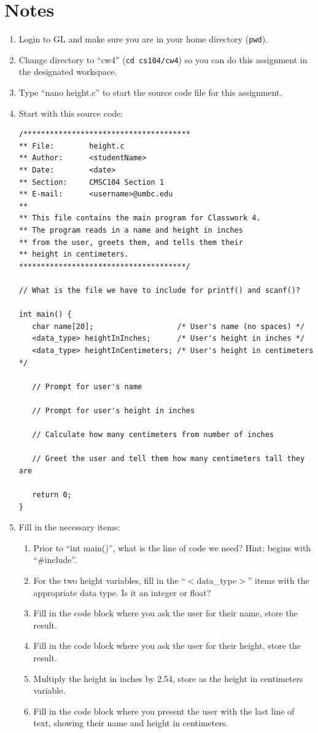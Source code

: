 \documentclass[letter,11pt]{article}
\begin{document}
\section*{Notes}
\begin{enumerate}
    \item Login to GL and make sure you are in your home directory (\texttt{pwd}).
    \item Change directory to ``cw4'' (\texttt{cd cs104/cw4}) so you can do this assignment in the designated workspace.
    \item Type ``nano height.c'' to start the source code file for this assignment.
    \item Start with this source code: 
    \begin{verbatim}
/**************************************
** File:        height.c
** Author:      <studentName>
** Date:        <date>
** Section:     CMSC104 Section 1
** E-mail:      <username>@umbc.edu
**
** This file contains the main program for Classwork 4.
** The program reads in a name and height in inches
** from the user, greets them, and tells them their
** height in centimeters.
**************************************/

// What is the file we have to include for printf() and scanf()?

int main() {
   char name[20];                   /* User's name (no spaces) */
   <data_type> heightInInches;      /* User's height in inches */
   <data_type> heightInCentimeters; /* User's height in centimeters */

   // Prompt for user's name

   // Prompt for user's height in inches

   // Calculate how many centimeters from number of inches

   // Greet the user and tell them how many centimeters tall they are

   return 0;
}
    \end{verbatim}
    \item Fill in the necessary items:
    \begin{enumerate}
        \item Prior to ``int main()'', what is the line of code we need? Hint: begins with ``\#include''.
        \item For the two height variables, fill in the ``$<$data\_type$>$'' items with the appropriate data type. Is it an integer or float?
        \item Fill in the code block where you ask the user for their name, store the result.
        \item Fill in the code block where you ask the user for their height, store the result.
        \item Multiply the height in inches by 2.54, store as the height in centimeters variable.
        \item Fill in the code block where you present the user with the last line of text, showing their name and height in centimeters.
    \end{enumerate}
\end{enumerate}
\end{document}
